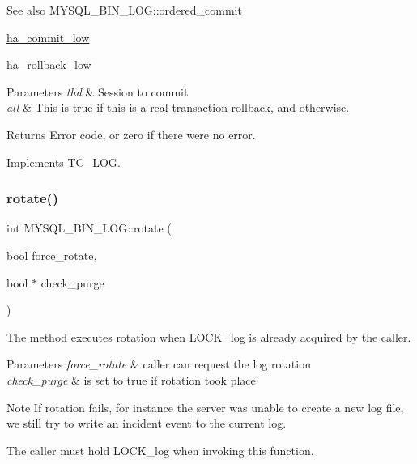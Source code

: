 \begin{DoxySeeAlso}{See also}
M\+Y\+S\+Q\+L\+\_\+\+B\+I\+N\+\_\+\+L\+O\+G\+::ordered\+\_\+commit 

\mbox{\hyperlink{handler_8cc_a4a77fdd0e1d6bee79e29e7495c7d752a}{ha\+\_\+commit\+\_\+low}} 

ha\+\_\+rollback\+\_\+low
\end{DoxySeeAlso}

\begin{DoxyParams}{Parameters}
{\em thd} & Session to commit \\
\hline
{\em all} & This is {\ttfamily true} if this is a real transaction rollback, and  otherwise.\\
\hline
\end{DoxyParams}
\begin{DoxyReturn}{Returns}
Error code, or zero if there were no error. 
\end{DoxyReturn}


Implements \mbox{\hyperlink{classTC__LOG_abf637f1bbf02c6f8e4f69aa2f5e2d362}{T\+C\+\_\+\+L\+OG}}.

\mbox{\label{group__Binary__Log_ga2053b0b53a46eb5702b44966497c333f}} 
\subsubsection{\texorpdfstring{rotate()}{rotate()}}
{\footnotesize\ttfamily int M\+Y\+S\+Q\+L\+\_\+\+B\+I\+N\+\_\+\+L\+O\+G\+::rotate (\begin{DoxyParamCaption}\item[{bool}]{force\+\_\+rotate,  }\item[{bool $\ast$}]{check\+\_\+purge }\end{DoxyParamCaption})}

The method executes rotation when L\+O\+C\+K\+\_\+log is already acquired by the caller.


\begin{DoxyParams}{Parameters}
{\em force\+\_\+rotate} & caller can request the log rotation \\
\hline
{\em check\+\_\+purge} & is set to true if rotation took place\\
\hline
\end{DoxyParams}
\begin{DoxyNote}{Note}
If rotation fails, for instance the server was unable to create a new log file, we still try to write an incident event to the current log.

The caller must hold L\+O\+C\+K\+\_\+log when invoking this function.
\end{DoxyNote}

